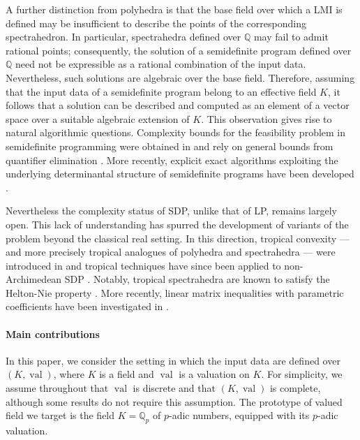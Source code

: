 \documentclass{elsarticle}
\theoremstyle{plain}
\theoremstyle{definition}
\DeclareMathOperator{\val}{val}
\def\QQ{\ensuremath{\mathbb{Q}}}
\begin{document}
A further distinction from polyhedra is that the base field over which a LMI is defined may be insufficient to describe the points of the corresponding spectrahedron. In particular, spectrahedra defined over $\QQ$ may fail to admit rational points; consequently, the solution of a semidefinite program defined over $\QQ$ need not be expressible as a rational combination of the input data. Nevertheless, such solutions are algebraic over the base field. Therefore, assuming that the input data of a semidefinite program belong to an effective field $K$, it follows that a solution can be described and computed as an element of a vector space over a suitable algebraic extension of $K$. This observation gives rise to natural algorithmic questions. Complexity bounds for the feasibility problem in semidefinite programming were obtained in \cite{porkolab1997complexity} and rely on general bounds from quantifier elimination \cite{renegar1992computational}. More recently, explicit exact algorithms exploiting the underlying determinantal structure of semidefinite programs have been developed \cite{henrion2016exact,NALDI2018206}.

Nevertheless the complexity status of SDP, unlike that of LP, remains largely
open. This lack of understanding has spurred the development of variants of the problem beyond the classical 
real setting.
In this direction, tropical convexity --- and more precisely tropical analogues of polyhedra and spectrahedra ---
were introduced in \cite{develin2004tropical,allamigeon_tropical_2020} and tropical techniques have since been applied to
non-Archimedean SDP \cite{allamigeon2016solving}. Notably, tropical spectrahedra are known to satisfy
the Helton-Nie property \cite{allamigeon2019tropical}. More recently, linear matrix inequalities with parametric coefficients
have been investigated in \cite{naldi2025solving}.

\paragraph{Main contributions}
In this paper, we consider the setting in which the input data are defined over $(K,\val)$,
where $K$ is a field and
$\val$ is a valuation on $K$. For simplicity, we assume throughout that $\val$ is discrete and that $(K,\val)$ is complete, although some results do not require this assumption. The prototype of valued field we target is the field $K=\QQ_p$ of $p$-adic numbers, equipped with its $p$-adic valuation.

\end{document}
